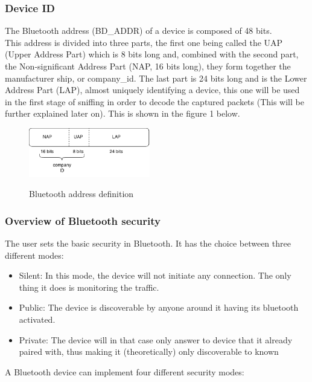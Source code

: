 \subsubsection{Device ID}

The Bluetooth address (BD\_ADDR) of a device is composed of 48 bits. \\
This address is divided into three parts, the first one being called the UAP (Upper Address Part) which is 8 bits long and, combined with the second part, the Non-significant Address Part (NAP, 16 bits long), they form together the manufacturer ship, or company\_id. The last part is 24 bits long and is the Lower Address Part (LAP), almost uniquely identifying a device, this one will be used in the first stage of sniffing in order to decode the captured packets (This will be further explained later on). This is shown in the figure 1 below.

\begin{figure}[!h]
  \begin{center}
	\includegraphics[width=200px]{images/bd_addr.png}
	\label{Bluetooth address}
	\caption{Bluetooth address definition}
  \end{center}
\end{figure}
\newpage
\subsubsection{Overview of Bluetooth security}

The user sets the basic security in Bluetooth. It has the choice between three different modes:
\begin{itemize}
 	\item Silent: In this mode, the device will not initiate any connection. The only thing it does is monitoring the traffic.
 	\item Public: The device is discoverable by anyone around it having its bluetooth activated.
 	\item Private: The device will in that case only answer to device that it already paired with, thus making it (theoretically) only discoverable to known 
\end{itemize}

\noindent A Bluetooth device can implement four different security modes:


